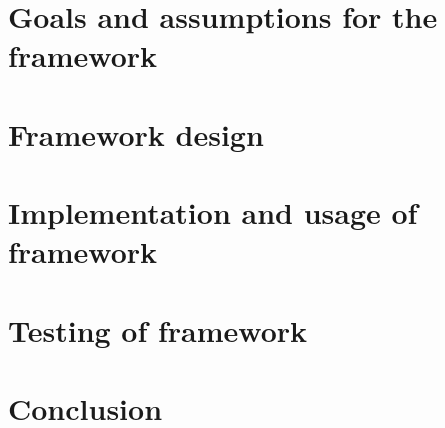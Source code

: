 \documentclass[12pt,twoside]{report}
\begin{document}



\tableofcontents
\setcounter{page}{3}



\chapter{Goals and assumptions for the framework}
\setcounter{page}{5}


\chapter{Framework design}


\chapter{Implementation and usage of framework}


\chapter{Testing of framework}


\chapter{Conclusion}


\printbibliography\
\end{document}
